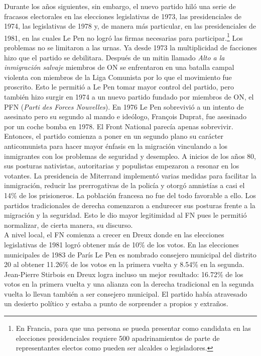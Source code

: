 Durante los años siguientes, sin embargo, el nuevo partido hiló una serie de fracasos electorales en las elecciones legislativas de 1973, las presidenciales de 1974, las legislativas de 1978 y, de manera más particular, en las presidenciales de 1981, en las cuales Le Pen no logró las firmas necesarias para participar.\footnote{En Francia, para que una persona se pueda presentar como candidata en las elecciones presidenciales requiere 500 apadrinamientos de parte de representantes electos como pueden ser alcaldes o legisladores.} Los problemas no se limitaron a las urnas. Ya desde 1973 la multiplicidad de facciones hizo que el partido se debilitara. Después de un mitin llamado \textit{Alto a la inmigración salvaje} miembros de ON se enfrentaron en una batalla campal violenta con miembros de la Liga Comunista por lo que el movimiento fue proscrito. Esto le permitió a Le Pen tomar mayor control del partido, pero también hizo surgir en 1974 a un nuevo partido fundado por miembros de ON, el PFN (\textit{Parti des Forces Nouvelles}). En 1976 Le Pen sobrevivió a un intento de asesinato pero su segundo al mando e ideólogo, François Duprat, fue asesinado por un coche bomba en 1978. El Front National parecía apenas sobrevivir.\\

Entonces, el partido comienza a poner en un segundo plano su carácter anticomunista para hacer mayor énfasis en la migración vinculando a los inmigrantes con los problemas de seguridad y desempleo. A inicios de los años 80, sus posturas nativistas, autoritarias y populistas empezaron a resonar en los votantes. La presidencia de Miterrand implementó varias medidas para facilitar la inmigración, reducir las prerrogativas de la policía y otorgó amnistías a casi el 14\% de los prisioneros. La población francesa no fue del todo favorable a ello. Los partidos tradicionales de derecha comenzaron a endurecer sus posturas frente a la migración y la seguridad. Esto le dio mayor legitimidad al FN pues le permitió normalizar, de cierta manera, su discurso.\\ 

A nivel local, el FN comienza a crecer en Dreux donde en las elecciones legislativas de 1981 logró obtener más de 10\% de los votos. En las elecciones municipales de 1983 de París Le Pen es nombrado consejero municipal del distrito 20 al obtener 11.26\% de los votos en la primera vuelta y 8.54\% en la segunda. Jean-Pierre Stirbois en Dreux logra incluso un mejor resultado: 16.72\% de los votos en la primera vuelta y una alianza con la derecha tradicional en la segunda vuelta lo llevan también a ser consejero municipal. El partido había atravesado un desierto político y estaba a punto de sorprender a propios y extraños.

